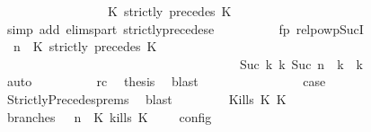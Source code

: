 \begin{isabellebody}
\ \ \ \ \ \ \ \ \ \ \ \ \ \ {\isasymturnstile}\ {\isasymPsi}\ {\isasymtriangleright}\ {\isacharparenleft}{\isacharparenleft}K\ strictly\ precedes\ K\ {\isacharhash}\ {\isasymPhi}{\isacharparenright}{\isacharparenright}{\isacartoucheclose}\isanewline
\ \ \ \ \ \ \ \ \ \ \isamarkupfalse%
\ {\isacharparenleft}simp\ add{\isacharcolon}\ elims{\isacharunderscore}part\ strictly{\isacharunderscore}precedes{\isacharunderscore}e{\isacharparenright}\isanewline
\ \ \ \ \ \ \ \ \isamarkupfalse%
\ fp\ relpowp{\isacharunderscore}Suc{\isacharunderscore}I{}\ \isamarkupfalse%
\ {\isacartoucheopen}{\isacharparenleft}{\isasymGamma}{\isacharcomma}\ n\ {\isasymturnstile}\ {\isacharparenleft}{\isacharparenleft}K\ strictly\ precedes\ K\ {\isacharhash}\ {\isasymPsi}{\isacharparenright}\ {\isasymtriangleright}\ {\isasymPhi}{\isacharparenright}\isanewline
\ \ \ \ \ \ \ \ \ \ \ \ \ \ \ \ \ \ \ \ \ \ \ \ \ \ \ \ \ \ \ \ \ \ \ \ \ \ {\isasymhookrightarrow}\isactrlbsup Suc\ k\isactrlesup \ {\isacharparenleft}{\isasymGamma}\isactrlsub k{\isacharcomma}\ Suc\ n\ {\isasymturnstile}\ {\isasymPsi}\isactrlsub k\ {\isasymtriangleright}\ {\isasymPhi}\isactrlsub k{\isacharparenright}{\isacartoucheclose}\isanewline
\ \ \ \ \ \ \ \ \ \ \isamarkupfalse%
\ auto\isanewline
\ \ \ \ \ \ \ \ \isamarkupfalse%
\ rc\ \isamarkupfalse%
\ {\isacharquery}thesis\ \isamarkupfalse%
\ blast\isanewline
\ \ \ \ \ \ \isamarkupfalse%
\isanewline
\ \ \ \ \ \ \isamarkupfalse%
\ \isamarkupfalse%
\ {\isacharquery}case\ \isamarkupfalse%
\ StrictlyPrecedes{\isachardot}prems{\isacharparenleft}{}{\isacharparenright}\ \isamarkupfalse%
\ blast\isanewline
\ \ \isamarkupfalse%
\isanewline
\ \ \ \ \isamarkupfalse%
\ {\isacharparenleft}Kills\ K\ K\isanewline
\ \ \ \ \ \ \isamarkupfalse%
\ branches{\isacharcolon}\ {\isacartoucheopen}{\isasymlbrakk}\ {\isasymGamma}{\isacharcomma}\ n\ {\isasymturnstile}\ {\isacharparenleft}{\isacharparenleft}K\ kills\ K\ {\isacharhash}\ {\isasymPsi}{\isacharparenright}\ {\isasymtriangleright}\ {\isasymPhi}\ {\isasymrbrakk}\isactrlsub c\isactrlsub o\isactrlsub n\isactrlsub f\isactrlsub i\isactrlsub g\isanewline

\end{isabellebody}
